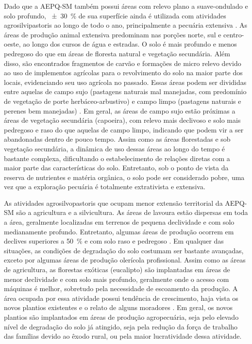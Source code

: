 Dado que a AEPQ-SM também possui áreas com relevo plano a suave-ondulado e solo profundo, 
\SI{\pm30}{\percent} de sua superfície ainda é utilizada com atividades agrosilvipastoris ao longo 
de todo o ano, principalmente a pecuária extensiva \cite{SamuelRosaEtAl2011a}. As áreas de produção
animal extensiva predominam nas porções norte, sul e centro-oeste, ao longo dos cursos de água e 
estradas. O solo é mais profundo e menos pedregoso do que em áreas de floresta natural e vegetação 
secundária. Além disso, são encontrados fragmentos de carvão e formações de micro relevo devido ao 
uso de implementos agrícolas para o revolvimento do solo na maior parte dos locais, evidenciando seu
uso agrícola no passado. Essas áreas podem ser divididas entre aquelas de campo sujo (pastagens 
naturais mal manejadas, com predomínio de vegetação de porte herbáceo-arbustivo) e campo limpo 
(pastagens naturais e perenes bem manejadas) \cite{SamuelRosaEtAl2011a}. Em geral, as áreas de 
campo sujo estão próximas a áreas de vegetação secundária (capoeira), com relevo mais declivoso e 
solo mais pedregoso e raso do que aquelas de campo limpo, indicando que podem vir a ser abandonadas 
dentro de pouco tempo. Assim como as áreas florestadas e sob vegetação secundária, a dinâmica de uso
dessas áreas ao longo do tempo é bastante complexa, dificultando o estabelecimento de relações 
diretas com a maior parte das características do solo. Entretanto, sob o ponto de vista da reserva 
de nutrientes e matéria orgânica, o solo pode ser considerado pobre, uma vez que a exploração 
pecuária é totalmente extrativista e extensiva.


As atividades agrosilvopastoris que ocupam menor extensão territorial da AEPQ-SM são a agricultura e
a silvicultura. As áreas de lavoura estão dispersas em toda a área, geralmente localizadas em 
terrenos de pequena declividade e com solo medianamente profundo. Entretanto, algumas áreas de 
produção ocorrem em declives superiores a \SI{50}{\percent} e com solo raso e pedregoso 
\cite{SamuelRosaEtAl2011a}. Em qualquer das situações, as condições de degradação do solo costumam 
ser bastante avançadas, exceto por algumas áreas de produção olerícola profissional. Assim como as 
áreas de agricultura, as florestas exóticas (eucalipto) são implantadas em áreas de menor 
declividade e com solo mais profundo, geralmente onde o acesso com máquinas é melhor, sobretudo pela
necessidade de escoamento da produção. A área ocupada por essa atividade possui tendência de 
crescimento, haja vista os novos plantios existentes e o relato de alguns moradores 
\cite{SamuelRosaEtAl2011a}. Em geral, os novos plantios são implantados em áreas de produção 
agropecuária, seja pelo elevado nível de degradação do solo já atingido, seja pela redução da força 
de trabalho das famílias devido ao êxodo rural, ou pela maior lucratividade dessa atividade.

